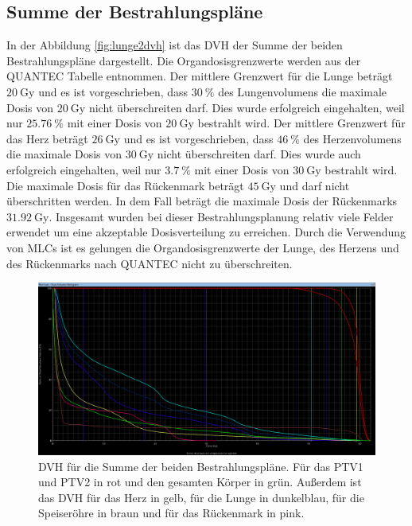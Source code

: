 \subsection*{Summe der Bestrahlungspläne}
In der Abbildung \ref{fig:lunge2dvh} ist das DVH der Summe der beiden Bestrahlungspläne dargestellt. Die Organdosisgrenzwerte werden aus der QUANTEC Tabelle entnommen. Der mittlere Grenzwert für die Lunge beträgt $\SI{20}{\gray}$ und es ist vorgeschrieben, dass $\SI{30}{\percent}$ des Lungenvolumens die maximale Dosis von $\SI{20}{\gray}$ nicht überschreiten darf. Dies wurde erfolgreich eingehalten, weil nur $\SI{25.76}{\percent}$ mit einer Dosis von $\SI{20}{\gray}$ bestrahlt wird.
Der mittlere Grenzwert für das Herz beträgt $\SI{26}{\gray}$ und es ist vorgeschrieben, dass $\SI{46}{\percent}$ des Herzenvolumens die maximale Dosis von $\SI{30}{\gray}$ nicht überschreiten darf. Dies wurde auch erfolgreich eingehalten, weil nur $\SI{3.7}{\percent}$ mit einer Dosis von $\SI{30}{\gray}$ bestrahlt wird.
Die maximale Dosis für das Rückenmark beträgt $\SI{45}{\gray}$ und darf nicht überschritten werden. In dem Fall beträgt die maximale Dosis der Rückenmarks $\SI{31.92}{\gray}$.
Insgesamt wurden bei dieser Bestrahlungsplanung relativ viele Felder erwendet um eine akzeptable Dosisverteilung zu erreichen. Durch die Verwendung von MLCs ist es gelungen die Organdosisgrenzwerte der Lunge, des Herzens und des Rückenmarks nach QUANTEC nicht zu überschreiten.

\begin{figure}[H]
	\centering
	\includegraphics[width=\linewidth]{Bilder/Lunge_DVHsum}
	\caption{DVH für die Summe der beiden Bestrahlungspläne. Für das PTV1 und PTV2 in rot und den gesamten Körper in grün. Außerdem ist das DVH für das Herz in gelb, für die Lunge in dunkelblau, für die Speiseröhre in braun und für das Rückenmark in pink.}
	\label{fig:lungedvhsum}
\end{figure}
